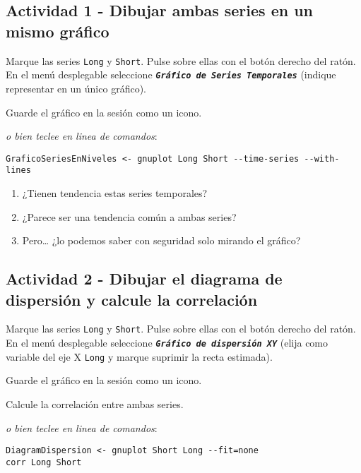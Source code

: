 \documentclass[11pt]{article}
\begin{document}
\subsection{Actividad 1 - Dibujar ambas series en un mismo gráfico}
\label{sec:org1afe996}
Marque las series \texttt{Long} y \texttt{Short}. Pulse sobre ellas con el botón
derecho del ratón. En el menú desplegable seleccione \textbf{\emph{\texttt{Gráfico de
Series Temporales}}} (indique representar en un único gráfico).

Guarde el gráfico en la sesión como un icono.

{\vspace{1pt} \footnotesize \color{gray!70!black}
\emph{o bien teclee en linea de comandos}:
\begin{verbatim}
GraficoSeriesEnNiveles <- gnuplot Long Short --time-series --with-lines
\end{verbatim}
}

\vspace{-3pt}

\begin{enumerate}
\item ¿Tienen tendencia estas series temporales?
\item ¿Parece ser una tendencia común a ambas series?
\item Pero\ldots{} ¿lo podemos saber con seguridad solo mirando el gráfico?
\end{enumerate}

\subsection{Actividad 2 - Dibujar el diagrama de dispersión y calcule la correlación}
\label{sec:org5c00e52}
Marque las series \texttt{Long} y \texttt{Short}. Pulse sobre ellas con el botón
derecho del ratón. En el menú desplegable seleccione \textbf{\emph{\texttt{Gráfico de
dispersión XY}}} (elija como variable del eje X \texttt{Long} y marque
suprimir la recta estimada).

Guarde el gráfico en la sesión como un icono.

Calcule la correlación entre ambas series.

{\vspace{1pt} \footnotesize \color{gray!70!black}
\emph{o bien teclee en linea de comandos}:
\begin{verbatim}
DiagramDispersion <- gnuplot Short Long --fit=none
corr Long Short
\end{verbatim}
}
\end{document}

